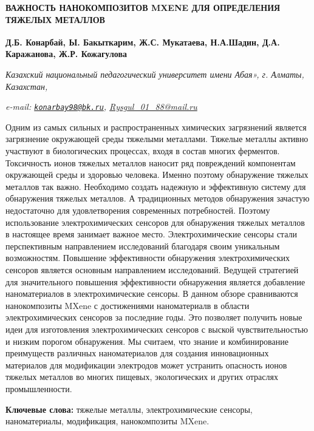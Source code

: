 \begin{articleheader}
{\bfseries ВАЖНОСТЬ НАНОКОМПОЗИТОВ MXENE ДЛЯ ОПРЕДЕЛЕНИЯ ТЯЖЕЛЫХ МЕТАЛЛОВ}

{\bfseries Д.Б. Конарбай\textsuperscript{\envelope },
Ы. Бакыткарим\textsuperscript{\envelope },
Ж.С. Мукатаева,
Н.А.Шадин,
Д.А. Каражанова,
Ж.Р. Кожагулова}
\end{articleheader}

\begin{affiliation}
\emph{Казахский национальный педагогический университет имени Абая», г. Алматы, Казахстан,}

\emph{e-mail: \href{mailto:konarbay98@bk.ru}{\nolinkurl{konarbay98@bk.ru}}, \href{mailto:Rysgul_01_88@mail.ru}{Rysgul\_01\_88@mail.ru}}
\end{affiliation}

Одним из самых сильных и распространенных химических загрязнений
является загрязнение окружающей среды тяжелыми металлами. Тяжелые
металлы активно участвуют в биологических процессах, входя в
состав многих ферментов. Токсичность ионов тяжелых металлов
наносит ряд повреждений компонентам окружающей среды и здоровью
человека. Именно поэтому обнаружение тяжелых металлов так важно.
Необходимо создать надежную и эффективную систему для обнаружения
тяжелых металлов. А традиционных методов обнаружения зачастую
недостаточно для удовлетворения современных потребностей. Поэтому
использование электрохимических сенсоров для обнаружения тяжелых
металлов в настоящее время занимает важное место.
Электрохимические сенсоры стали перспективным направлением
исследований благодаря своим уникальным возможностям. Повышение
эффективности обнаружения электрохимических сенсоров является
основным направлением исследований. Ведущей стратегией для
значительного повышения эффективности обнаружения является
добавление наноматериалов в электрохимические сенсоры. В данном
обзоре сравниваются нанокомпозиты MXene с достижениями
наноматериалв в области электрохимических сенсоров за последние
годы. Это позволяет получить новые идеи для изготовления
электрохимических сенсоров с выской чувствительностью и низким
порогом обнаружения. Мы считаем, что знание и комбинирование
преимуществ различных наноматериалов для создания инновационных
материалов для модификации электродов может устранить опасность
ионов тяжелых металлов во многих пищевых, экологических и других
отраслях промышленности.

{\bfseries Ключевые слова:} тяжелые металлы, электрохимические
сенсоры, наноматериалы, модификация, нанокомпозиты MXene.

